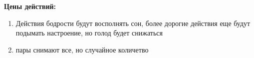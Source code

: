 \documentclass[]{article}
\begin{document}
	\
	
	\
	
	\large{\textbf{Цены действий:}}
	\begin{enumerate}[-]
		\item Действия бодрости будут восполнять сон, более дорогие действия еще будут подымать настроение, но голод будет снижаться
		\item пары снимают все, но случайное количетво
	\end{enumerate}
\end{document}
